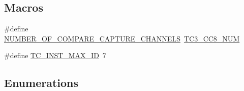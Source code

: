 \subsection*{Macros}
\begin{DoxyCompactItemize}
\item 
\#define \mbox{\hyperlink{group__asfdoc__sam0__tc__group_gac837f9db5df1793578c195a979c6a9d3}{N\+U\+M\+B\+E\+R\+\_\+\+O\+F\+\_\+\+C\+O\+M\+P\+A\+R\+E\+\_\+\+C\+A\+P\+T\+U\+R\+E\+\_\+\+C\+H\+A\+N\+N\+E\+LS}}~\mbox{\hyperlink{tc3_8h_a2d4adcedec07af5cc0519e42d1bf2180}{T\+C3\+\_\+\+C\+C8\+\_\+\+N\+UM}}
\item 
\#define \mbox{\hyperlink{group__asfdoc__sam0__tc__group_ga94cdbe531468f0975311bc2ce36f5e1c}{T\+C\+\_\+\+I\+N\+S\+T\+\_\+\+M\+A\+X\+\_\+\+ID}}~7
\end{DoxyCompactItemize}
\subsection*{Enumerations}
